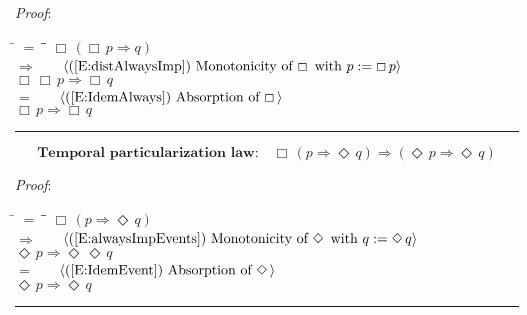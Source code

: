 \documentclass[12pt, fleqn, leqno]{article}
\newcommand{\lgap}{2pt}                             %
\newcommand{\mymathindent}{24pt}                    %
\newcommand{\impl}{\ensuremath{\Rightarrow}}        %
\newcommand{\Event}{\Diamond\,}
\newcommand{\Always}{\Box\,}
\newcommand{\myqed}{\rule[-.23ex]{1.2ex}{2.0ex}}
\newcommand{\myqedtab}{\hspace{384pt}}              %
\newcommand{\Gll} {\langle}                         %
\newcommand{\Ggg} {\rangle}                         %
\newcommand{\Hint}[1]     {\ \ \ $\Gll              \mbox{#1} \Ggg$ }   %
\begin{document}
\emph{Proof}:
\begin{tabbing}
\hspace{\mymathindent} \= $= \;$ \= \myqedtab \= \kill
  \> \>   $\Always (\Always p \impl q)$\\[\lgap]
  \> $\impl$  \>  \Hint{(\ref{E:distAlwaysImp}) Monotonicity of $\Always$ with $p:=\Always p$}\\[\lgap]
  \> \>   $\Always \Always p \impl \Always q$\\[\lgap]
  \> $=$  \>  \Hint{(\ref{E:IdemAlways}) Absorption of $\Always$}\\[\lgap]
  \> \>   $\Always p \impl \Always q$ \quad \myqed
\end{tabbing}
\begin{equation}\label{E:tempPartLaw}
\textbf{Temporal particularization law:}\quad \Always ( p \impl \Event q) \impl (\Event p \impl \Event q)
\end{equation}

\emph{Proof}:
\begin{tabbing}
\hspace{\mymathindent} \= $= \;$ \= \myqedtab \= \kill
  \> \>   $\Always ( p \impl \Event q)$\\[\lgap]
  \> $\impl$  \>  \Hint{(\ref{E:alwaysImpEvents}) Monotonicity of $\Event$ with $q:=\Event q$}\\[\lgap]
  \> \>   $\Event p \impl \Event \Event q$\\[\lgap]
  \> $=$  \>  \Hint{(\ref{E:IdemEvent}) Absorption of $\Event$}\\[\lgap]
  \> \>   $\Event p \impl \Event q$ \quad \myqed
\end{tabbing}
\end{document}
